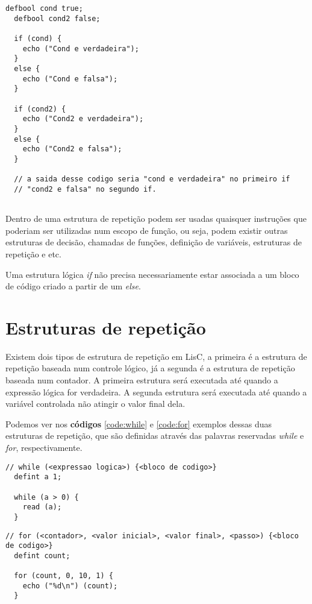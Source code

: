 \documentclass[
  12pt,				%
  oneside,			%
  a4paper,			%
  english,			%
  french,				%
  spanish,			%
  brazil,				%
]{abntex2}
\begin{document}
\begin{lstlisting}[label=code:ifelse,caption=Exemplo do uso de
  instruções de controles lógicos]
  defbool cond true;
  defbool cond2 false;

  if (cond) {
    echo ("Cond e verdadeira");
  }
  else {
    echo ("Cond e falsa");    
  }

  if (cond2) {
    echo ("Cond2 e verdadeira");        
  }
  else {
    echo ("Cond2 e falsa");        
  }

  // a saida desse codigo seria "cond e verdadeira" no primeiro if
  // "cond2 e falsa" no segundo if.
  
\end{lstlisting}

Dentro de uma estrutura de repetição podem ser usadas quaisquer
instruções que poderiam ser utilizadas num escopo de função, ou seja,
podem existir outras estruturas de decisão, chamadas de funções,
definição de variáveis, estruturas de repetição e etc.

Uma estrutura lógica \emph{if} não precisa necessariamente estar
associada a um bloco de código criado a partir de um \emph{else}.

\section{Estruturas de repetição}
\label{sec:estruturas-de-repeticao}

Existem dois tipos de estrutura de repetição em LisC, a primeira é a
estrutura de repetição baseada num controle lógico, já a segunda é a
estrutura de repetição baseada num contador. A primeira estrutura será
executada até quando a expressão lógica for verdadeira. A segunda
estrutura será executada até quando a variável controlada não atingir
o valor final dela.

Podemos ver nos \textbf{códigos} \ref{code:while} e \ref{code:for} 
exemplos dessas duas estruturas de repetição, que são definidas
através das palavras reservadas \emph{while} e \emph{for}, respectivamente.

\begin{lstlisting}[label=code:while,caption=Exemplo da estrutura de
  repetição while]
  // while (<expressao logica>) {<bloco de codigo>}
  defint a 1;

  while (a > 0) {
    read (a);
  }

\end{lstlisting}

\begin{lstlisting}[label=code:for,caption=Exemplo da estrutura de
  repetição for]
  // for (<contador>, <valor inicial>, <valor final>, <passo>) {<bloco de codigo>}
  defint count;

  for (count, 0, 10, 1) {
    echo ("%d\n") (count);
  }
\end{lstlisting}
\end{document}
